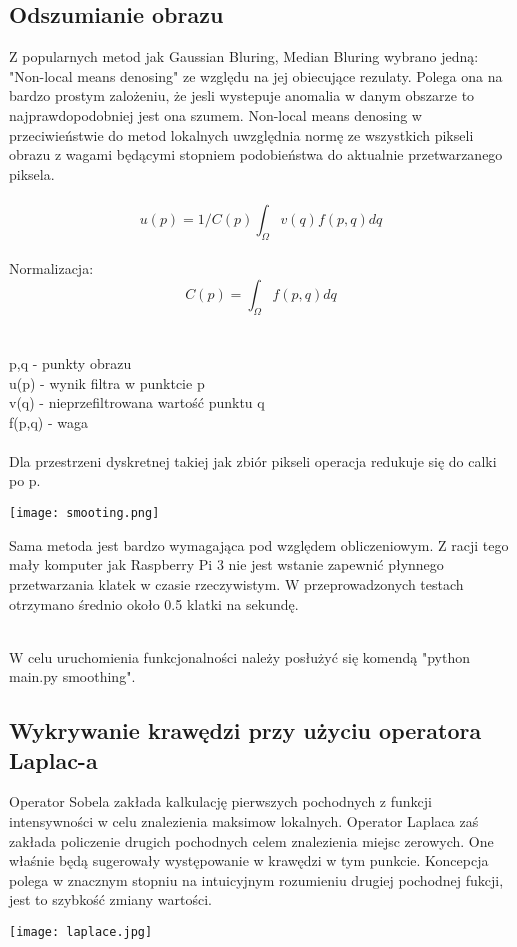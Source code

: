 \documentclass{article}
\begin{document}
\subsection{Odszumianie obrazu}
Z popularnych metod jak Gaussian Bluring, Median Bluring wybrano jedną: "Non-local means denosing" ze względu na jej obiecujące rezulaty. Polega ona na bardzo prostym zalożeniu, że jesli wystepuje anomalia w danym obszarze to najprawdopodobniej jest ona szumem. Non-local means denosing w przeciwieństwie do metod lokalnych uwzględnia normę ze wszystkich pikseli obrazu z wagami będącymi stopniem podobieństwa do aktualnie przetwarzanego piksela. \\
\\
$$u(p) = 1/C(p) \int_{\Omega} v(q)f(p,q)dq $$
\\
Normalizacja:
\\
$$C(p) = \int_{\Omega} f(p,q)dq $$ \\
\\
p,q - punkty obrazu\\
u(p) - wynik filtra w punktcie p\\
v(q) - nieprzefiltrowana wartość punktu q\\
f(p,q) - waga\\
\\
Dla przestrzeni dyskretnej takiej jak zbiór pikseli operacja redukuje się do calki po p.

\begin{center}
    \texttt{[image: smooting.png]}
\end{center}

Sama metoda jest bardzo wymagająca pod względem obliczeniowym. Z racji tego mały komputer jak Raspberry Pi 3 nie jest wstanie zapewnić płynnego przetwarzania klatek w czasie rzeczywistym. W przeprowadzonych testach otrzymano średnio około 0.5 klatki na sekundę.

\\
W celu uruchomienia funkcjonalności należy posłużyć się komendą "python main.py smoothing".

\subsection{Wykrywanie krawędzi przy użyciu operatora Laplac-a}
Operator Sobela zakłada kalkulację pierwszych pochodnych z funkcji intensywności w celu znalezienia maksimow lokalnych. Operator Laplaca zaś zakłada policzenie drugich pochodnych celem znalezienia miejsc zerowych. One właśnie będą sugerowały występowanie w krawędzi w tym punkcie. Koncepcja polega w znacznym stopniu na intuicyjnym rozumieniu drugiej pochodnej fukcji, jest to szybkość zmiany wartości.\\
\begin{center}
    \texttt{[image: laplace.jpg]}
\end{center}
\end{document}
